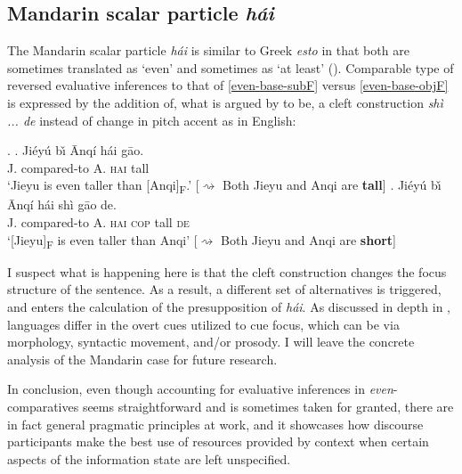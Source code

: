 \documentclass[12pt,letterpaper]{scrartcl}
\newcommand{\alignright}{\hspace*{\fill}}
\newcommand{\infer}{$\rightsquigarrow$ }
\newcommand{\sub}[1]{\textsubscript{#1}}
\begin{document}
\subsection{Mandarin scalar particle \textit{h\'{a}i}} 


The Mandarin scalar particle \textit{h\'{a}i} is similar to Greek \textit{esto} in that both are sometimes translated as `even' and sometimes as `at least' (\cite{giannakidou_landscape_2007}). Comparable type of reversed evaluative inferences to that of \ref{even-base-subF} versus \ref{even-base-objF} is expressed by the addition of, what is argued by \cite{paul_shi_2008} to be, a cleft construction \textit{sh\`{i} ... de} instead of change in pitch accent as in English:

\ex. \ag. Ji\'{e}y\'{u} b\v{\i} \={A}nq\'{i} h\'{a}i g\={a}o. \\
		J. compared-to A. \textsc{hai} tall \\
		`Jieyu is even taller than [Anqi]\sub{F}.' \alignright [\infer Both Jieyu and Anqi are \textbf{tall}] \label{hai}
\bg. Ji\'{e}y\'{u} b\v{\i} \={A}nq\'{i} h\'{a}i sh\`{i} g\={a}o de. \\
		J. compared-to A. \textsc{hai} \textsc{cop} tall \textsc{de} \\
		`[Jieyu]\sub{F} is even taller than Anqi' \alignright
		[\infer Both Jieyu and Anqi are \textbf{short}] \label{haishide}

I suspect what is happening here is that the cleft construction changes the focus structure of the sentence. As a result, a different set of alternatives is triggered, and enters the calculation of the presupposition of \textit{h\'{a}i}. As discussed in depth in \cite{lee_topic_2008}, languages differ in the overt cues utilized to cue focus, which can be via morphology, syntactic movement, and/or prosody. I will leave the concrete analysis of the Mandarin case for future research.

In conclusion, even though accounting for evaluative inferences in \textit{even}-comparatives seems straightforward and is sometimes taken for granted, there are in fact general pragmatic principles at work, and it showcases how discourse participants make the best use of resources provided by context when certain aspects of the information state are left unspecified.
\end{document}
